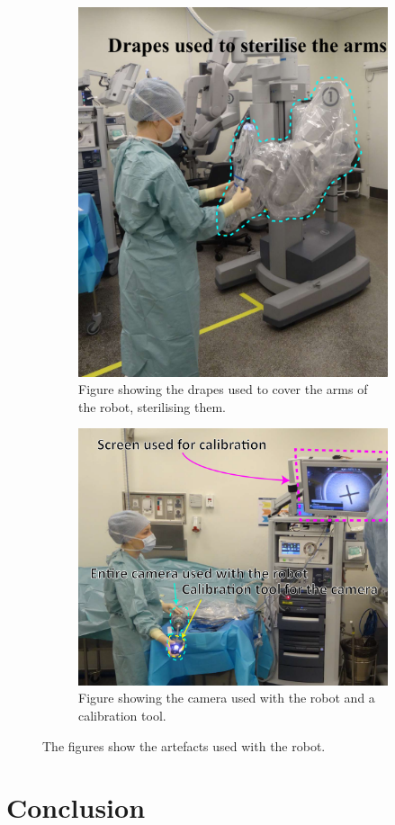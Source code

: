 \documentclass[paper=a4, fontsize=11pt]{scrartcl} %
\numberwithin{equation}{section} %
\numberwithin{figure}{section} %
\numberwithin{table}{section} %
\begin{document}
\begin{figure}
	\centering
	\begin{subfigure}[b]{0.4\textwidth}
		\includegraphics[width=\textwidth]{drapes}
		\caption{Figure showing the drapes used to cover the arms of the robot, sterilising them.}
		\label{fig:drapes}
	\end{subfigure}
	\begin{subfigure}[b]{0.4\textwidth}
		\includegraphics[width=\textwidth]{camera}
		\caption{Figure showing the camera used with the robot and a calibration tool.}
		\label{fig:camera}
	\end{subfigure}
	\caption{The figures show the artefacts used with the robot.}
	\label{fig:artefacts}
\end{figure}
\section{Conclusion}
\end{document}
